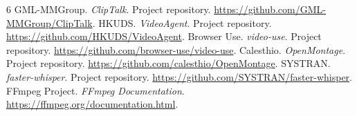 \begin{thebibliography}{6}
 GML-MMGroup. \emph{ClipTalk}. Project repository. \url{https://github.com/GML-MMGroup/ClipTalk}.
 HKUDS. \emph{VideoAgent}. Project repository. \url{https://github.com/HKUDS/VideoAgent}.
 Browser Use. \emph{video-use}. Project repository. \url{https://github.com/browser-use/video-use}.
 Calesthio. \emph{OpenMontage}. Project repository. \url{https://github.com/calesthio/OpenMontage}.
 SYSTRAN. \emph{faster-whisper}. Project repository. \url{https://github.com/SYSTRAN/faster-whisper}.
 FFmpeg Project. \emph{FFmpeg Documentation}. \url{https://ffmpeg.org/documentation.html}.
\end{thebibliography}